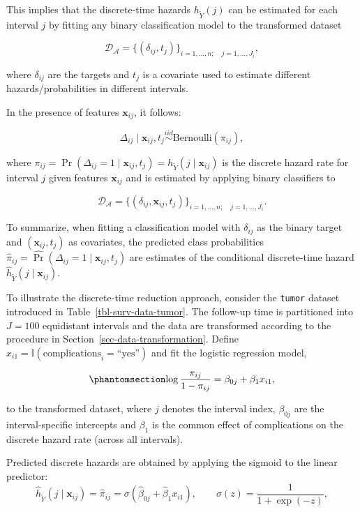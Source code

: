 \documentclass[
  letterpaper,
  krantz2]{style/krantz}
\begin{document}
This implies that the discrete-time hazards \(h_{\tilde{Y}}(j)\) can be
estimated for each interval \(j\) by fitting any binary classification
model to the transformed dataset

\[
\mathcal{D}_{\mathcal{A}} = \{(\delta_{ij}, t_{j})\}_{i=1,\ldots,n;\quad j=1,\ldots,J_i},
\]

where \(\delta_{ij}\) are the targets and \(t_j\) is a covariate used to
estimate different hazards/probabilities in different intervals.

In the presence of features \(\mathbf{x}_{ij}\), it follows:

\[
\Delta_{ij} \mid \mathbf{x}_{ij}, t_j \stackrel{iid}{\sim} \text{Bernoulli}(\pi_{ij}),
\]

where
\(\pi_{ij} = \Pr(\Delta_{ij} = 1 \mid \mathbf{x}_{ij}, t_j) = h_{\tilde{Y}}(j \mid \mathbf{x}_{ij})\)
is the discrete hazard rate for interval \(j\) given features
\(\mathbf{x}_{ij}\) and is estimated by applying binary classifiers to

\[
\mathcal{D}_{\mathcal{A}} = \{(\delta_{ij}, \mathbf{x}_{ij}, t_{j})\}_{i=1,\ldots,n;\quad j=1,\ldots,J_i}.
\]

To summarize, when fitting a classification model with \(\delta_{ij}\)
as the binary target and \((\mathbf{x}_{ij}, t_j)\) as covariates, the
predicted class probabilities
\(\hat{\pi}_{ij} = \widehat{\Pr}(\Delta_{ij}=1 \mid \mathbf{x}_{ij}, t_j)\)
are estimates of the conditional discrete-time hazard
\(\hat{h}_{\tilde{Y}}(j \mid \mathbf{x}_{ij})\).

To illustrate the discrete-time reduction approach, consider the
\texttt{tumor} dataset introduced in Table~\ref{tbl-surv-data-tumor}.
The follow-up time is partitioned into \(J = 100\) equidistant intervals
and the data are transformed according to the procedure in
Section~\ref{sec-data-transformation}. Define
\(x_{i1} = \mathbb{I}(\text{complications}_i = \text{``yes''})\) and fit
the logistic regression model,

\begin{equation}\phantomsection\label{eq-discrete-time-glm-po}{
\log\frac{\pi_{ij}}{1-\pi_{ij}} = \beta_{0j} + \beta_1 x_{i1},
}\end{equation}

to the transformed dataset, where \(j\) denotes the interval index,
\(\beta_{0j}\) are the interval-specific intercepts and \(\beta_1\) is
the common effect of complications on the discrete hazard rate (across
all intervals).

Predicted discrete hazards are obtained by applying the sigmoid to the
linear predictor: \[
\hat{h}_{\tilde{Y}}(j \mid \mathbf{x}_{ij}) = \hat{\pi}_{ij} = \sigma(\hat{\beta}_{0j} + \hat{\beta}_1 x_{i1}), \qquad \sigma(z) = \frac{1}{1 + \exp(-z)},
\]
\end{document}
